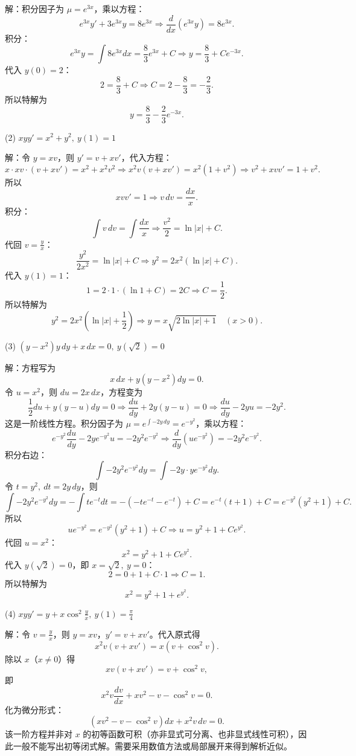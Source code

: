 解：积分因子为 \(\mu=e^{3x}\)，乘以方程：
\[ e^{3x}y'+3e^{3x}y=8e^{3x}\Rightarrow\frac{d}{dx}\left(e^{3x}y\right)=8e^{3x}. \]
积分：
\[ e^{3x}y=\int8e^{3x}dx=\frac{8}{3}e^{3x}+C\Rightarrow y=\frac{8}{3}+Ce^{-3x}. \]
代入 \(y(0)=2\)：
\[ 2=\frac{8}{3}+C\Rightarrow C=2-\frac{8}{3}=-\frac{2}{3}. \]
所以特解为
\[ y=\frac{8}{3}-\frac{2}{3}e^{-3x}. \]

(2) \(xyy'=x^{2}+y^{2},\ y(1)=1\)

解：令 \(y=xv\)，则 \(y'=v+xv'\)，代入方程：
\[ x\cdot xv\cdot(v+xv')=x^{2}+x^{2}v^{2}\Rightarrow x^{2}v(v+xv')=x^{2}(1+v^{2})\Rightarrow v^{2}+xvv'=1+v^{2}. \]
所以
\[ xvv'=1\Rightarrow v\,dv=\frac{dx}{x}. \]
积分：
\[ \int v\,dv=\int\frac{dx}{x}\Rightarrow\frac{v^{2}}{2}=\ln|x|+C. \]
代回 \(v=\frac{y}{x}\)：
\[ \frac{y^{2}}{2x^{2}}=\ln|x|+C\Rightarrow y^{2}=2x^{2}(\ln|x|+C). \]
代入 \(y(1)=1\)：
\[ 1=2\cdot1\cdot(\ln1+C)=2C\Rightarrow C=\frac{1}{2}. \]
所以特解为
\[ y^{2}=2x^{2}\left(\ln|x|+\frac{1}{2}\right)\Rightarrow y=x\sqrt{2\ln|x|+1}\quad(x>0). \]

(3) \((y-x^{2})y\,dy+x\,dx=0,\ y(\sqrt2)=0\)

解：方程写为
\[ x\,dx+y(y-x^{2})dy=0. \]
令 \(u=x^{2}\)，则 \(du=2x\,dx\)，方程变为
\[ \frac{1}{2}du+y(y-u)dy=0\Rightarrow\frac{du}{dy}+2y(y-u)=0\Rightarrow\frac{du}{dy}-2yu=-2y^{2}. \]
这是一阶线性方程。积分因子为 \(\mu=e^{\int-2y\,dy}=e^{-y^{2}}\)，乘以方程：
\[ e^{-y^{2}}\frac{du}{dy}-2ye^{-y^{2}}u=-2y^{2}e^{-y^{2}}\Rightarrow\frac{d}{dy}\left(ue^{-y^{2}}\right)=-2y^{2}e^{-y^{2}}. \]
积分右边：
\[ \int-2y^{2}e^{-y^{2}}dy=\int-2y\cdot ye^{-y^{2}}dy. \]
令 \(t=y^{2},\ dt=2y\,dy\)，则
\[ \int-2y^{2}e^{-y^{2}}dy=-\int te^{-t}dt=-\left(-te^{-t}-e^{-t}\right)+C=e^{-t}(t+1)+C=e^{-y^{2}}(y^{2}+1)+C. \]
所以
\[ ue^{-y^{2}}=e^{-y^{2}}(y^{2}+1)+C\Rightarrow u=y^{2}+1+Ce^{y^{2}}. \]
代回 \(u=x^{2}\)：
\[ x^{2}=y^{2}+1+Ce^{y^{2}}. \]
代入 \(y(\sqrt2)=0\)，即 \(x=\sqrt2,\ y=0\)：
\[ 2=0+1+C\cdot1\Rightarrow C=1. \]
所以特解为
\[ x^{2}=y^{2}+1+e^{y^{2}}. \]

(4) \(xyy'=y+x\cos^{2}\frac{y}{x},\ y(1)=\frac{\pi}{4}\)

解：令 \(v=\frac{y}{x}\)，则 \(y=xv\)，\(y'=v+xv'\)。代入原式得
\[ x^{2}v(v+xv')=x(v+\cos^{2}v). \]
除以 \(x\)（\(x\ne0\)）得
\[ xv(v+xv')=v+\cos^{2}v, \]
即
\[ x^{2}v\frac{dv}{dx}+xv^{2}-v-\cos^{2}v=0. \]
化为微分形式：
\[ \left(xv^{2}-v-\cos^{2}v\right)dx+x^{2}v\,dv=0. \]
该一阶方程并非对 \(x\) 的初等函数可积（亦非显式可分离、也非显式线性可积），因此一般不能写出初等闭式解。需要采用数值方法或局部展开来得到解析近似。

